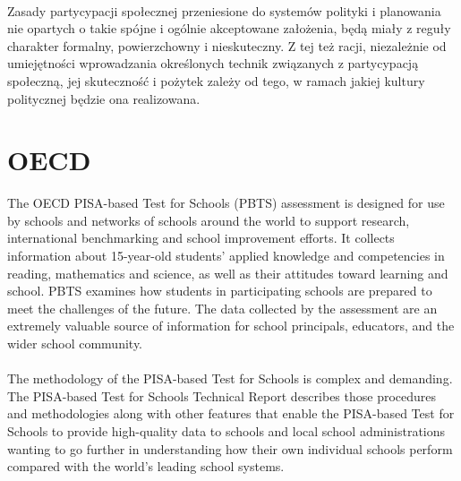 \documentclass{article}
\begin{document}
\paragraph{}
Zasady partycypacji społecznej przeniesione do systemów polityki i planowania nie opartych o takie spójne i ogólnie akceptowane założenia, będą miały z reguły charakter formalny, powierzchowny i nieskuteczny. Z tej też racji, niezależnie od umiejętności wprowadzania określonych technik związanych z partycypacją społeczną, jej skuteczność i pożytek zależy od tego, w ramach jakiej kultury politycznej będzie ona realizowana. \cite{Partycypacja}
\section{OECD}
The OECD PISA-based Test for Schools (PBTS) assessment is designed for use by schools and networks of schools around the world to support research, international benchmarking and school improvement efforts. It collects information about 15-year-old students’ applied knowledge and competencies in reading, mathematics and science, as well as their attitudes toward learning and school. PBTS examines how students in participating schools are prepared to meet the challenges of the future. The data collected by the assessment are an extremely valuable source of information for school principals, educators, and the wider school community.
\paragraph{}
The methodology of the PISA-based Test for Schools is complex and demanding. The PISA-based Test for Schools Technical Report describes those procedures and methodologies along with other features that enable the PISA-based Test for Schools to provide high-quality data to schools and local school administrations wanting to go further in understanding how their own individual schools perform compared with the world’s leading school systems. \cite{zamałotychtestów}
\newpage


\end{document}
